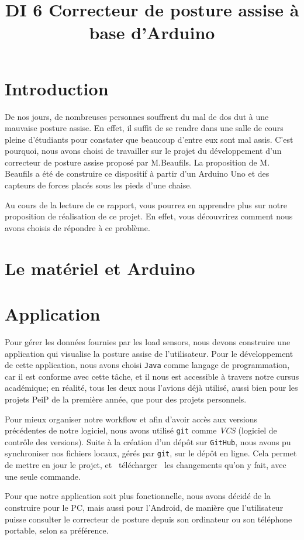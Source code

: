\documentclass{polytech/polytech}
\title{DI 6 Correcteur de posture assise à base d'Arduino}
\begin{document}
\chapter*{Introduction}

De nos jours, de nombreuses personnes souffrent du mal de dos dut à une mauvaise posture assise. En effet, il suffit de se rendre dans une salle de cours pleine d'étudiants pour constater que beaucoup d'entre eux sont mal assis. C'est pourquoi, nous avons choisi de travailler sur le projet du développement d'un correcteur de posture assise proposé par M.Beaufils. La proposition de M. Beaufils a été de construire ce dispositif à partir d'un Arduino Uno et des capteurs de forces placés sous les pieds d'une chaise. 

Au cours de la lecture de ce rapport, vous pourrez en apprendre plus sur notre proposition de réalisation de ce projet. En effet, vous découvrirez comment nous avons choisis de répondre à ce problème.

\chapter{Le matériel et Arduino}

\chapter{Application}

Pour gérer les données fournies par les load sensors, nous devons construire une application qui visualise la posture assise de l'utilisateur. Pour le développement de cette application, nous avons choisi \texttt{Java} comme langage de programmation, car il est conforme avec cette tâche, et il nous est accessible à travers notre cursus académique; en réalité, tous les deux nous l'avions déjà utilisé, aussi bien pour les projets PeiP de la première année, que pour des projets personnels.

Pour mieux organiser notre workflow et afin d'avoir accès aux versions précédentes de notre logiciel, nous avons utilisé \texttt{git} comme \textit{VCS} (logiciel de contrôle des versions). Suite à la création d'un dépôt sur \texttt{GitHub}, nous avons pu synchroniser nos fichiers locaux, gérés par \texttt{git}, sur le dépôt en ligne. Cela permet de mettre en jour le projet, et \guillemotleft\ télécharger \guillemotright\ les changements qu'on y fait, avec une seule commande.

Pour que notre application soit plus fonctionnelle, nous avons décidé de la construire pour le PC, mais aussi pour l'Android, de manière que l'utilisateur puisse consulter le correcteur de posture depuis son ordinateur ou son téléphone portable, selon sa préférence.
\end{document}
